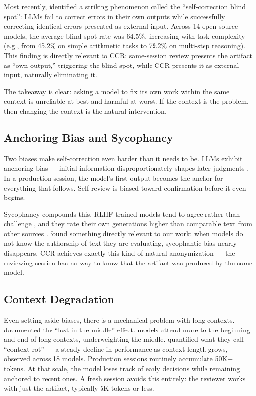 \documentclass[11pt]{article}
\begin{document}
Most recently, \citet{tsui2025selfcorrection} identified a striking phenomenon called the ``self-correction blind spot'': LLMs fail to correct errors in their own outputs while successfully correcting identical errors presented as external input. Across 14 open-source models, the average blind spot rate was 64.5\%, increasing with task complexity (e.g., from 45.2\% on simple arithmetic tasks to 79.2\% on multi-step reasoning). This finding is directly relevant to CCR: same-session review presents the artifact as ``own output,'' triggering the blind spot, while CCR presents it as external input, naturally eliminating it.

The takeaway is clear: asking a model to fix its own work within the same context is unreliable at best and harmful at worst. If the context is the problem, then changing the context is the natural intervention.

\subsection{Anchoring Bias and Sycophancy}

Two biases make self-correction even harder than it needs to be. LLMs exhibit anchoring bias --- initial information disproportionately shapes later judgments \citep{lou2026anchoring}. In a production session, the model's first output becomes the anchor for everything that follows. Self-review is biased toward confirmation before it even begins.

Sycophancy compounds this. RLHF-trained models tend to agree rather than challenge \citep{sharma2024towards}, and they rate their own generations higher than comparable text from other sources \citep{panickssery2024llm}. \citet{choi2025identity} found something directly relevant to our work: when models do not know the authorship of text they are evaluating, sycophantic bias nearly disappears. CCR achieves exactly this kind of natural anonymization --- the reviewing session has no way to know that the artifact was produced by the same model.

\subsection{Context Degradation}

Even setting aside biases, there is a mechanical problem with long contexts. \citet{liu2024lost} documented the ``lost in the middle'' effect: models attend more to the beginning and end of long contexts, underweighting the middle. \citet{hong2025context} quantified what they call ``context rot'' --- a steady decline in performance as context length grows, observed across 18 models. Production sessions routinely accumulate 50K+ tokens. At that scale, the model loses track of early decisions while remaining anchored to recent ones. A fresh session avoids this entirely: the reviewer works with just the artifact, typically 5K tokens or less.
\end{document}

